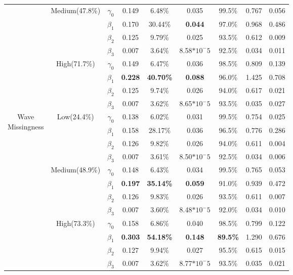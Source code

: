 \documentclass{svjour3}                     %
\begin{document}
\begin{table}[p]
\begin{tabular}{c|c|c|cccccc}
		&\multirow{4}{*}{Medium(47.8\%)}
		& $\gamma_0$ & 0.149 & 6.48\% & 0.035 & 99.5\% & 0.767 & 0.056 \\
		&& $\beta_1$ & 0.170 & 30.44\% & \textbf{0.044} & 97.0\% & 0.968 & 0.486 \\
		&& $\beta_2$ & 0.125 & 9.79\% & 0.025 & 93.5\% & 0.612 & 0.009 \\
		&& $\beta_3$ & 0.007 & 3.64\% & 8.58$*10^-5$ & 92.5\% & 0.034 & 0.011 \\ \cline{2-9} \noalign{\smallskip}
		& \multirow{4}{*}{High(71.7\%)}
		& $\gamma_0$ & 0.149 & 6.47\% & 0.036 & 98.5\% & 0.809 & 0.139 \\
		&& $\beta_1$ & \textbf{0.228} & \textbf{40.70\%} & \textbf{0.088} & 96.0\% & 1.425 & 0.708 \\
		&& $\beta_2$ & 0.125 & 9.74\% & 0.026 & 94.0\% & 0.617 & 0.021 \\
		&& $\beta_3$ & 0.007 & 3.62\% & 8.65$*10^-5$ & 93.5\% & 0.035 & 0.027 \\
		\midrule
		\midrule
		\multirow{12}{*}{\parbox{1.75cm}{Wave \\ Missingness}}
		& \multirow{4}{*}{Low(24.4\%)}
		& $\gamma_0$ & 0.138 & 6.02\% & 0.031 & 99.5\% & 0.754 & 0.025 \\
		&& $\beta_1$ & 0.158 & 28.17\% & 0.036 & 96.5\% & 0.776 & 0.286 \\
		&& $\beta_2$ & 0.126 & 9.82\% & 0.026 & 94.0\% & 0.611 & 0.004 \\
		&& $\beta_3$ & 0.007 & 3.61\% & 8.50$*10^-5$ & 92.5\% & 0.034 & 0.006 \\ \cline{2-9} \noalign{\smallskip}
		&\multirow{4}{*}{Medium(48.9\%)}
		& $\gamma_0$ & 0.148 & 6.43\% & 0.034 & 99.5\% & 0.765 & 0.053 \\
		&& $\beta_1$ & \textbf{0.197} & \textbf{35.14\%} & \textbf{0.059} & 91.0\% & 0.939 & 0.472 \\
		&& $\beta_2$ & 0.126 & 9.83\% & 0.026 & 93.5\% & 0.611 & 0.007 \\
		&& $\beta_3$ & 0.007 & 3.60\% & 8.48$*10^-5$ & 92.0\% & 0.034 & 0.010 \\ \cline{2-9} \noalign{\smallskip}
		& \multirow{4}{*}{High(73.3\%)}
		& $\gamma_0$ & 0.158 & 6.86\% & 0.040 & 98.5\% & 0.799 & 0.122 \\
		&& $\beta_1$ & \textbf{0.303} & \textbf{54.18\%} &\textbf{0.148} & \textbf{89.5\%} & 1.290 & 0.676 \\
		&& $\beta_2$ & 0.127 & 9.94\% & 0.027 & 95.5\% & 0.615 & 0.015 \\
		&& $\beta_3$ & 0.007 & 3.62\% & 8.77$*10^-5$ & 93.5\% & 0.035 & 0.021 \\
		\bottomrule
	\end{tabular}	
\end{table}
\end{document}
